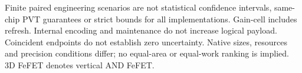 \begin{table}[t]
{\begin{tabular}{@{}ll rrrr rrrr rrrr@{}}
\bottomrule\end{tabular}}
\par\smallskip\begin{minipage}{\textwidth}\footnotesize
Finite paired engineering scenarios are not statistical confidence intervals, same-chip PVT guarantees or strict bounds for all implementations. Gain-cell includes refresh. Internal encoding and maintenance do not increase logical payload. Coincident endpoints do not establish zero uncertainty. Native sizes, resources and precision conditions differ; no equal-area or equal-work ranking is implied. 3D FeFET denotes vertical AND FeFET.
\end{minipage}
\end{table}
